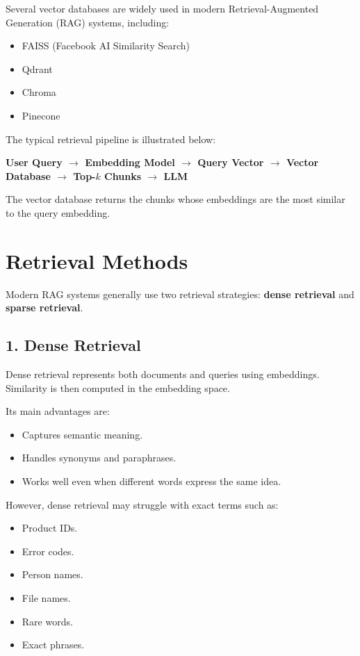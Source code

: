 Several vector databases are widely used in modern Retrieval-Augmented Generation (RAG) systems, including:

\begin{itemize}
    \item FAISS (Facebook AI Similarity Search)
    \item Qdrant
    \item Chroma
    \item Pinecone
\end{itemize}

The typical retrieval pipeline is illustrated below:

\begin{center}
\textbf{User Query $\rightarrow$ Embedding Model $\rightarrow$ Query Vector $\rightarrow$ Vector Database $\rightarrow$ Top-$k$ Chunks $\rightarrow$ LLM}
\end{center}

The vector database returns the chunks whose embeddings are the most similar to the query embedding.
\section{Retrieval Methods}

Modern RAG systems generally use two retrieval strategies: \textbf{dense retrieval} and \textbf{sparse retrieval}.

\subsection*{1. Dense Retrieval}

Dense retrieval represents both documents and queries using embeddings. Similarity is then computed in the embedding space.

Its main advantages are:

\begin{itemize}
    \item Captures semantic meaning.
    \item Handles synonyms and paraphrases.
    \item Works well even when different words express the same idea.
\end{itemize}

However, dense retrieval may struggle with exact terms such as:

\begin{itemize}
    \item Product IDs.
    \item Error codes.
    \item Person names.
    \item File names.
    \item Rare words.
    \item Exact phrases.
\end{itemize}


